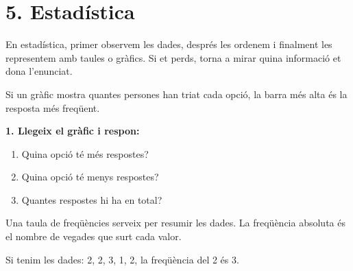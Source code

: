 \documentclass[12pt,a4paper]{article}
\begin{document}
\section*{5. Estadística}

\begin{capsula}
En estadística, primer observem les dades, després les ordenem i finalment les representem amb taules o gràfics. Si et perds, torna a mirar quina informació et dona l'enunciat.
\end{capsula}

\begin{exemple}
Si un gràfic mostra quantes persones han triat cada opció, la barra més alta és la resposta més freqüent.
\end{exemple}

\textbf{1. Llegeix el gràfic i respon:}

\begin{center}
\end{center}

\begin{enumerate}[label=\alph*)]
    \item Quina opció té més respostes? \vspace{0.6cm}
    \item Quina opció té menys respostes? \vspace{0.6cm}
    \item Quantes respostes hi ha en total? \vspace{0.6cm}
\end{enumerate}

\begin{capsula}
Una taula de freqüències serveix per resumir les dades. La freqüència absoluta és el nombre de vegades que surt cada valor.
\end{capsula}

\begin{exemple}
Si tenim les dades: 2, 2, 3, 1, 2, la freqüència del 2 és 3.
\end{exemple}
\end{document}
